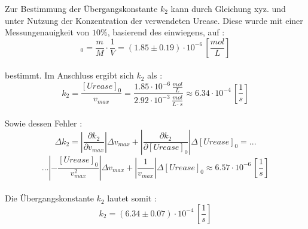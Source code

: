 Zur Bestimmung der Übergangskonstante $k_2$ kann durch Gleichung xyz. und unter Nutzung der Konzentration der verwendeten Urease. Diese wurde mit einer Messungenauigkeit von $10\%$, basierend des  einwiegens, auf :
\begin{equation}
[Urease]_0 = \frac{m}{M}\cdot \frac{1}{V} =  (1.85 \pm 0.19)\cdot 10^{-6} \,[\si{\frac{mol}{L}}]
\end{equation} \\
bestimmt. Im Anschluss ergibt sich $k_2$ als : 
\begin{equation}
k_2 = \frac{[Urease]_0}{v_{max}} = \frac{1.85 \cdot 10^{-6} \, \si{\frac{mol}{L}}}{2.92\cdot 10^{-3}\, \si{\frac{mol}{L\cdot s}}} \approx 6.34 \cdot 10^{-4} \, [\si{\frac{1}{s}}]
\end{equation}
\\
Sowie dessen Fehler : 
\begin{equation}
\Delta k_2 = |\frac{\partial k_2}{\partial v_{max}}|\Delta v_{max} + |\frac{\partial k_2}{\partial [Urease]_0}|\Delta [Urease]_0  = ...
\end{equation}
\begin{equation*}
... |-\frac{[Urease]_0}{v_{max}^2}|\Delta v_{max} + |\frac{1}{v_{max}}|\Delta [Urease]_0 \approx 6.57 \cdot 10^{-6} \,[\si{\frac{1}{s}}]
\end{equation*}
\\
Die Übergangskonstante $k_2$ lautet somit : 
\begin{equation}
k_2 = (6.34 \pm 0.07)\cdot 10^{-4}\,[\si{\frac{1}{s}}]
\end{equation}
%